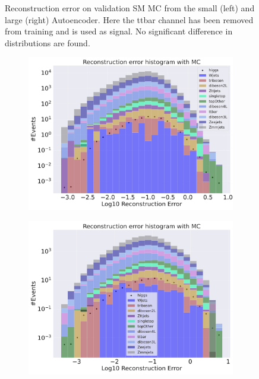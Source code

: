 \begin{figure}[H]
\begin{subfigure}{.45\textwidth}
        \caption{ }
        \label{fig:ae_big_ttbar}
    \end{subfigure}
    \hfill 
    \caption[AE | Reconstruction error using ttbar channel as signal]{Reconstruction error on validation SM MC from the small (left) and large (right) Autoencoder. Here the ttbar channel has been removed from training and 
    is used as signal. No significant difference in distributions are found.  }
    \label{fig:ae_big_channel_3}
\end{figure}



\begin{figure}[H]
    \centering
    \begin{subfigure}{.45\textwidth}
        \includegraphics[width=\textwidth]{Figures/VAE_testing/small/b_data_recon_big_rm3_feats_sig_higgs.pdf}
        \caption{}
        \label{fig:vae_small_higgs}
    \end{subfigure}
    \hfill 
    \begin{subfigure}{.45\textwidth}
        \includegraphics[width=\textwidth]{Figures/VAE_testing/big/b_data_recon_big_rm3_feats_sig_higgs.pdf}

\end{subfigure}
\end{figure}
